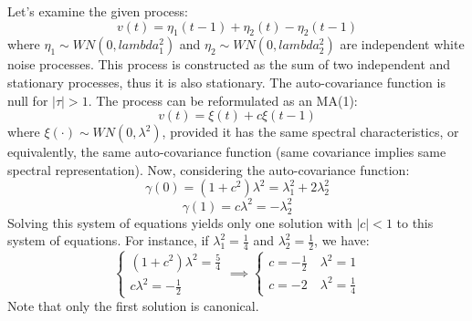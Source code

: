 \begin{example}
    Let's examine the given process:
    \[v(t)=\eta_1(t-1)+\eta_2(t)-\eta_2(t-1)\]
    where $\eta_1\sim WN(0,lambda_1^2)$ and $\eta_2\sim WN(0,lambda_2^2)$ are independent white noise processes.
    This process is constructed as the sum of two independent and stationary processes, thus it is also stationary.
    The auto-covariance function is null for $\left\lvert \tau\right\rvert  > 1$. 
    The process can be reformulated as an MA(1):
    \[v(t)=\xi (t)+c\xi (t-1)\]
    where $\xi (\cdot)\sim WN(0,\lambda^2)$, provided it has the same spectral characteristics, or equivalently, the same auto-covariance function (same covariance implies same spectral representation).
    Now, considering the auto-covariance function:
    \[\gamma(0)=(1+c^2)\lambda^2=\lambda_1^2+2\lambda_2^2\]
    \[\gamma(1)=c\lambda^2=-\lambda_2^2\]
    Solving this system of equations yields only one solution with $\left\lvert c \right\rvert  < 1$ to this system of equations. 
    For instance, if $\lambda_1^2=\frac{1}{4}$ and $\lambda_2^2=\frac{1}{2}$, we have:
    \[\begin{cases}
        (1+c^2)\lambda^2=\frac{5}{4} \\
        c\lambda^2=-\frac{1}{2}
    \end{cases} \implies \begin{cases}
        c=-\frac{1}{2} \quad \lambda^2=1 \\
        c=-2 \quad \lambda^2=\frac{1}{4}
    \end{cases}\]
    Note that only the first solution is canonical.
\end{example}